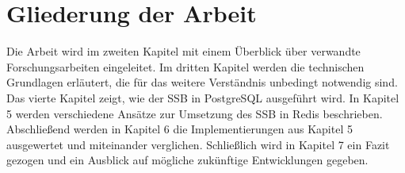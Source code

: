\section{Gliederung der Arbeit}
Die Arbeit wird im zweiten Kapitel mit einem Überblick über verwandte Forschungsarbeiten eingeleitet.
Im dritten Kapitel werden die technischen Grundlagen erläutert, die für das weitere Verständnis unbedingt notwendig sind.
Das vierte Kapitel zeigt, wie der \acf{SSB} in PostgreSQL ausgeführt wird.
In Kapitel 5 werden verschiedene Ansätze zur Umsetzung des \ac{SSB} in Redis beschrieben.
Abschließend werden in Kapitel 6 die Implementierungen aus Kapitel 5 ausgewertet und miteinander verglichen.
Schließlich wird in Kapitel 7 ein Fazit gezogen und ein Ausblick auf mögliche zukünftige Entwicklungen gegeben.

 
